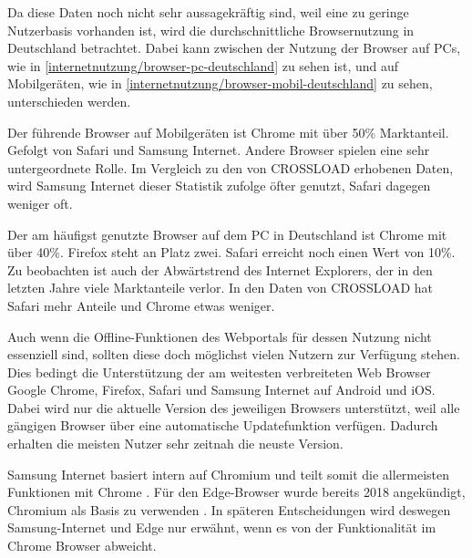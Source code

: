 
Da diese Daten noch nicht sehr aussagekräftig sind, weil eine zu geringe Nutzerbasis vorhanden ist, wird die durchschnittliche Browsernutzung in Deutschland betrachtet. Dabei kann zwischen der Nutzung der Browser auf PCs, wie in \autoref{internetnutzung/browser-pc-deutschland} zu sehen ist, und auf Mobilgeräten, wie in \autoref{internetnutzung/browser-mobil-deutschland} zu sehen, unterschieden werden. 


Der führende Browser auf Mobilgeräten ist Chrome mit über 50\% Marktanteil. Gefolgt von Safari und Samsung Internet. Andere Browser spielen eine sehr untergeordnete Rolle. Im Vergleich zu den von CROSSLOAD erhobenen Daten, wird Samsung Internet dieser Statistik zufolge öfter genutzt, Safari dagegen weniger oft.


Der am häufigst genutzte Browser auf dem PC in Deutschland ist Chrome mit über 40\%. Firefox steht an Platz zwei. Safari erreicht noch einen Wert von 10\%. Zu beobachten ist auch der Abwärtstrend des Internet Explorers, der in den letzten Jahre viele Marktanteile verlor. In den Daten von CROSSLOAD hat Safari mehr Anteile und Chrome etwas weniger.

Auch wenn die Offline-Funktionen des Webportals für dessen Nutzung nicht essenziell sind, sollten diese doch möglichst vielen Nutzern zur Verfügung stehen. Dies bedingt die Unterstützung der am weitesten verbreiteten Web Browser Google Chrome, Firefox, Safari und Samsung Internet auf Android und iOS. Dabei wird nur die aktuelle Version des jeweiligen Browsers unterstützt, weil alle gängigen Browser über eine automatische Updatefunktion verfügen. Dadurch erhalten die meisten Nutzer sehr zeitnah die neuste Version.

Samsung Internet basiert intern auf Chromium und teilt somit die allermeisten Funktionen mit Chrome \autocite{samsung-webkit}. Für den Edge-Browser wurde bereits 2018 angekündigt, Chromium als Basis zu verwenden \autocite{edge-faq}. In späteren Entscheidungen wird deswegen Samsung-Internet und Edge nur erwähnt, wenn es von der Funktionalität im Chrome Browser abweicht.

